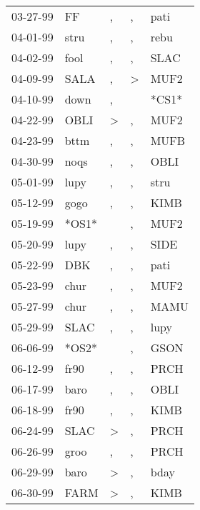 \begin{supertabular}{lllll}
 03-27-99 &     FF &                , &                , &   pati \\
 04-01-99 &   stru &                , &                , &   rebu \\
 04-02-99 &   fool &                , &                , &   SLAC \\
 04-09-99 &   SALA &                , &     \textgreater &   MUF2 \\
 04-10-99 &   down &                , &                  &  *CS1* \\
 04-22-99 &   OBLI &     \textgreater &                , &   MUF2 \\
 04-23-99 &   bttm &                , &                , &   MUFB \\
 04-30-99 &   noqs &                , &                , &   OBLI \\
 05-01-99 &   lupy &                , &                , &   stru \\
 05-12-99 &   gogo &                , &                , &   KIMB \\
 05-19-99 &  *OS1* &                  &                , &   MUF2 \\
 05-20-99 &   lupy &                , &                , &   SIDE \\
 05-22-99 &    DBK &                , &                , &   pati \\
 05-23-99 &   chur &                , &                , &   MUF2 \\
 05-27-99 &   chur &                , &                , &   MAMU \\
 05-29-99 &   SLAC &                , &                , &   lupy \\
 06-06-99 &  *OS2* &                  &                , &   GSON \\
 06-12-99 &   fr90 &                , &                , &   PRCH \\
 06-17-99 &   baro &                , &                , &   OBLI \\
 06-18-99 &   fr90 &                , &                , &   KIMB \\
 06-24-99 &   SLAC &     \textgreater &                , &   PRCH \\
 06-26-99 &   groo &                , &                , &   PRCH \\
 06-29-99 &   baro &     \textgreater &                , &   bday \\
 06-30-99 &   FARM &     \textgreater &                , &   KIMB \\

\end{supertabular}

